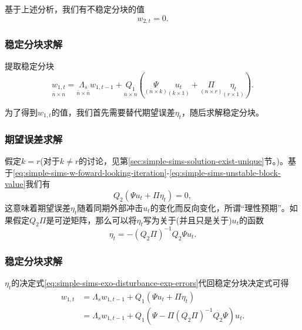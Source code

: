 基于上述分析，我们有不稳定分块的值
\begin{equation}
  \label{eq:simple-sims-unstable-block-value}
  w_{2,t} = 0.
\end{equation}

\subsubsection{稳定分块求解}
提取稳定分块
\begin{equation*}
  \underset{\bar{n} \times n}{w_{1,t}} = \underset{\bar{n} \times \bar{n}}{\Lambda_s} w_{1,t-1} + \underset{\bar{n} \times n}{Q_1} \left( \underset{\left(\bar{n} \times k \right)}{\Psi} \underset{\left(k \times 1\right)}{u_{t}} + \underset{\left( n \times r \right)}{\Pi} \underset{\left(r \times 1 \right)}{\eta_{t}} \right).
\end{equation*}

为了得到$w_{1,t}$的值，我们首先需要替代期望误差$\eta_t$，随后求解稳定分块。

\subsubsection{期望误差求解}
假定$k=r$(对于$k \neq r$的讨论，见第\ref{sec:simple-sims-solution-exist-unique}节。)。基于\eqref{eq:simple-sims-w-foward-looking-iteration}-\eqref{eq:simple-sims-unstable-block-value}我们有
\begin{equation}
  \label{eq:simple-sims-x-solution-existence}
  Q_2 \left( \Psi u_{t} + \Pi \eta_{t} \right) = 0,
\end{equation}
这意味着期望误差$\eta_t$随着同期外部冲击$u_t$的变化而反向变化，所谓``理性预期''。如果假定$Q_2 \Pi$是可逆矩阵，那么可以将$\eta_t$写为关于(并且只是关于)$u_t$的函数
\begin{equation}
  \label{eq:simple-sims-exo-disturbance-exp-errors}
  \eta_t = -\left(Q_2 \Pi \right) ^{-1} Q_2 \Psi u_t.
\end{equation}

\subsubsection{稳定分块求解}
$\eta_t$的决定式\eqref{eq:simple-sims-exo-disturbance-exp-errors}代回稳定分块决定式可得
\begin{equation}
  \label{eq:simple-sims-stable-block-value}
  \begin{split}
    w_{1,t} &= \Lambda_s w_{1,t-1} + Q_1 \left( \Psi u_{t} + \Pi \eta_{t} \right) \\
    &= \Lambda_s w_{1,t-1} + Q_1 \left( \Psi - \Pi \left( Q_2 \Pi \right)^{-1} Q_2 \Psi \right) u_t.
  \end{split}
\end{equation}

